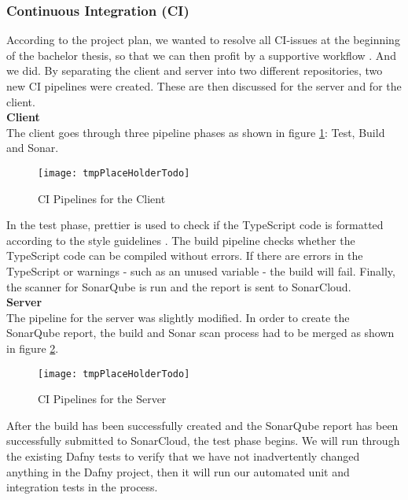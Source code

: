\subsubsection{Continuous Integration (CI)}
According to the project plan,
we wanted to resolve all CI-issues at the beginning of the bachelor thesis,
so that we can then profit by a supportive workflow \cite{projectplan}. 
And we did.
By separating the client and server into two different repositories, two new CI pipelines were created.
These are then discussed for the server and for the client. \\

{\bf Client}\\
The client goes through three pipeline phases as shown in figure \ref{fig:ci_client}: Test, Build and Sonar.

\begin{figure}[H]
    \centering
    \texttt{[image: tmpPlaceHolderTodo]}
    \caption{CI Pipelines for the Client}
    \label{fig:ci_client}
\end{figure}

In the test phase, prettier \cite{dev} is used to check if the TypeScript code
is formatted according to the style guidelines \cite{projectplan}.
The build pipeline checks whether the TypeScript code can be compiled without errors.
If there are errors in the TypeScript or warnings - such as an unused variable - the build will fail.
Finally, the scanner for SonarQube is run and the report is sent to SonarCloud. \\

{\bf Server}\\
The pipeline for the server was slightly modified.
In order to create the SonarQube report, the build and Sonar scan process had to be merged
as shown in figure \ref{fig:ci_server}.

\begin{figure}[H]
    \centering
    \texttt{[image: tmpPlaceHolderTodo]}
    \caption{CI Pipelines for the Server}
    \label{fig:ci_server}
\end{figure}

After the build has been successfully created
and the SonarQube report has been successfully submitted to SonarCloud,
the test phase begins.
We will run through the existing Dafny tests to verify
that we have not inadvertently changed anything in the Dafny project,
then it will run our automated unit and integration tests in the  process. \\

